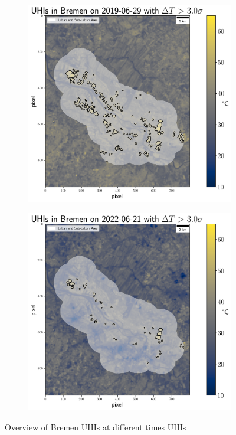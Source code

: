 \documentclass[12pt,a4paper, english,twoside]{article}
\begin{document}
   \begin{figure}[!p]
     \centering

       \begin{subfigure}[b]{\textwidth}
          \includegraphics[width=\textwidth]{img/UHIs_Bremen_2019-06-29_s:3}
         \label{fig:uhis2019}
       \end{subfigure}

       \begin{subfigure}[b]{\textwidth}
          \includegraphics[width=\textwidth]{img/UHIs_Bremen_2022-06-21_s:3}
         \label{fig:uhis2022}
       \end{subfigure}
         \caption{Overview of Bremen UHIs at different times \glspl{UHI}}\label{fig:AnalysisBre}
   \end{figure}
\end{document}
